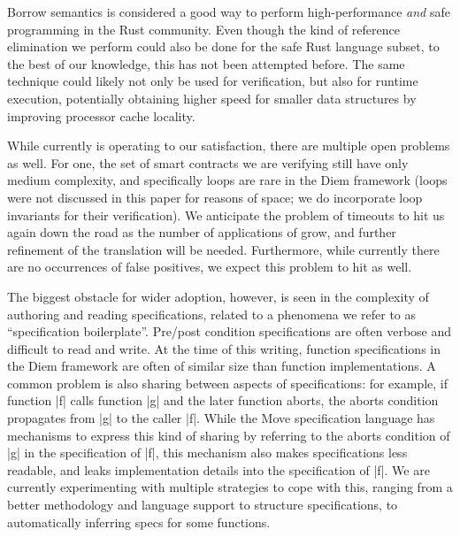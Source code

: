 Borrow semantics is considered a good way to perform high-performance \emph{and}
safe programming in the Rust community. Even though the kind of reference
elimination we perform could also be done for the safe Rust language subset, to
the best of our knowledge, this has not been attempted before. The same
technique could likely not only be used for verification, but also for runtime
execution, potentially obtaining higher speed for smaller data structures by
improving processor cache locality.


While currently \MVP is operating to our satisfaction, there are multiple open
problems as well. For one, the set of smart contracts we are verifying still
have only medium complexity, and specifically loops are rare in the Diem
framework (loops were not discussed in this paper for reasons of space; we do
incorporate loop invariants for their verification). We anticipate the problem
of timeouts to hit us again down the road as the number of applications of \MVP
grow, and further refinement of the translation will be needed. Furthermore,
while currently there are no occurrences of false positives, we expect this problem
to hit as well.

The biggest obstacle for wider adoption, however, is seen in the complexity of
authoring and reading specifications, related to a phenomena we refer to as
``specification boilerplate''. Pre/post condition specifications are often
verbose and difficult to read and write. At the time of this writing, function
specifications in the Diem framework are often of similar size than function
implementations.  A common problem is also sharing between aspects of specifications:
for example, if function |f| calls function |g| and the later function aborts, the
aborts condition propagates from |g| to the caller |f|. While the Move specification
language has mechanisms to express this kind of sharing by referring to the aborts
condition of |g| in the specification of |f|, this mechanism also makes specifications
less readable, and leaks implementation details into the specification of |f|.
We are currently experimenting with multiple strategies to cope with this, ranging
from a better methodology and language support to structure specifications, to
automatically inferring specs for some functions.



